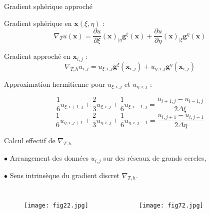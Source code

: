 \documentclass[11pt]{beamer}
\begin{document}
\begin{frame}{Gradient sphérique approché}
\begin{block}{}
Gradient sphérique en $\mathbf{x} ( \xi, \eta)$ :
$$\nabla_T u( \mathbf{x} ) = \dfrac{\partial u}{\partial \xi} ( \mathbf{x} ) _{| \eta} \mathbf{g}^{\xi} (\mathbf{x}) + \dfrac{\partial u}{\partial \eta} ( \mathbf{x} ) _{| \xi} \mathbf{g}^{\eta} (\mathbf{x})$$
\end{block}

\begin{block}{}
Gradient approché en $\mathbf{x}_{i,j}$ :
$$\nabla_{T,h} u_{i,j}  =  u_{\xi,i,j} \mathbf{g}^{\xi} (\mathbf{x}_{i,j}) + u_{\eta, i, j} \mathbf{g}^{\eta} (\mathbf{x}_{i,j})$$
\end{block}

Approximation hermitienne pour $u_{\xi, i, j}$ et $u_{\eta, i, j}$ :

\begin{block}{}
\begin{equation*}
\dfrac{1}{6}u_{\xi,i+1,j}+\dfrac{2}{3}u_{\xi,i,j} + \dfrac{1}{6}u_{\xi,i-1,j} = \dfrac{u_{i+1,j}- u_{i-1,j}}{2\Delta \xi}
\end{equation*}
\begin{equation*}
\dfrac{1}{6}u_{\eta,i,j+1}+\dfrac{2}{3}u_{\eta,i,j} + \dfrac{1}{6}u_{\eta,i,j-1} = \dfrac{u_{i,j+1}- u_{i,j-1}}{2 \Delta \eta}
\end{equation*}
\end{block}
\end{frame}




\begin{frame}{Calcul effectif de $\nabla_{T,h}$}

\begin{block}{}
$\bullet$ Arrangement des données $u_{i,j}$ sur des réseaux de grands cercles,

$\bullet$ Sens intrinsèque du gradient discret $\nabla_{T,h}$.
\end{block}

\begin{columns}
\begin{figure}
\begin{center}
\texttt{[image: fig22.jpg]}
\end{center}
\end{figure}
\begin{figure}
\begin{center}
\texttt{[image: fig72.jpg]}
\end{center}
\end{figure}
\end{columns}


\end{frame}
\end{document}

